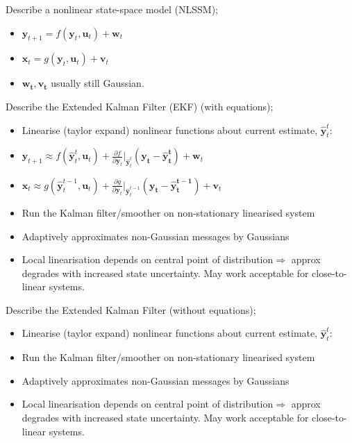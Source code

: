 \documentclass{article}
\begin{document}
Describe a nonlinear state-space model (NLSSM); \begin{itemize} \item $\mathbf{y}_{t+1}=f(\mathbf{y}_t, \mathbf{u}_t)+\mathbf{w}_t$ \item $\mathbf{x}_t=g(\mathbf{y}_t, \mathbf{u}_t)+\mathbf{v}_t$ \item $\mathbf{w_t, v_t}$ usually still Gaussian. \end{itemize}

Describe the Extended Kalman Filter (EKF) (with equations); \begin{itemize} \item Linearise (taylor expand) nonlinear functions about current estimate, $\mathbf{\hat{y}}^t_t$: \item $\mathbf{y}_{t+1}\approx f(\mathbf{\hat{y}}^t_t, \mathbf{u}_t) + \frac{\partial f}{\partial \mathbf{y}_t}|_{\hat{\mathbf{y}}^t_t}(\mathbf{y_t-\hat{y}^t_t})+\mathbf{w}_t$ \item $\mathbf{x}_{t}\approx g(\mathbf{\hat{y}}^{t-1}_t, \mathbf{u}_t) + \frac{\partial g}{\partial \mathbf{y}_t}|_{\hat{\mathbf{y}}^{t-1}_t}(\mathbf{y_t-\hat{y}^{t-1}_t})+\mathbf{v}_t$ \item Run the Kalman filter/smoother on non-stationary linearised system \item Adaptively approximates non-Gaussian messages by Gaussians \item Local linearisation depends on central point of distribution$\Rightarrow$ approx degrades with increased state uncertainty. May work acceptable for close-to-linear systems. \end{itemize}

Describe the Extended Kalman Filter (without equations); \begin{itemize} \item Linearise (taylor expand) nonlinear functions about current estimate, $\mathbf{\hat{y}}^t_t$: \item Run the Kalman filter/smoother on non-stationary linearised system \item Adaptively approximates non-Gaussian messages by Gaussians \item Local linearisation depends on central point of distribution$\Rightarrow$ approx degrades with increased state uncertainty. May work acceptable for close-to-linear systems. \end{itemize}
\end{document}
